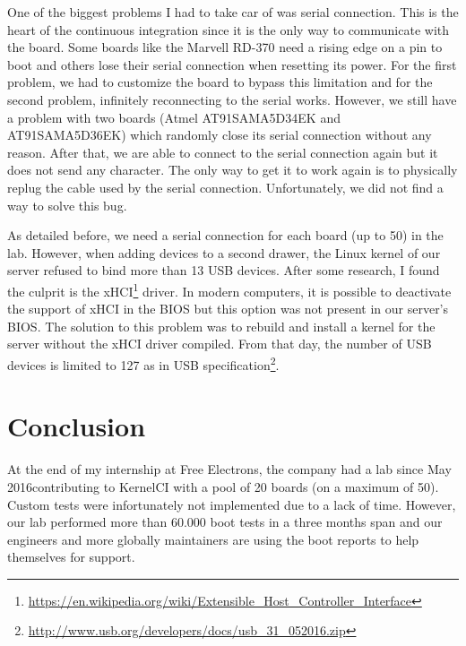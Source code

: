 One of the biggest problems I had to take car of was serial connection. This is the heart of the continuous integration since it is the only way to communicate with the board. Some boards like the Marvell RD-370 need a rising edge on a pin to boot and others lose their serial connection when resetting its power. For the first problem, we had to customize the board to bypass this limitation and for the second problem, infinitely reconnecting to the serial works. However, we still have a problem with two boards (Atmel AT91SAMA5D34EK and AT91SAMA5D36EK) which randomly close its serial connection without any reason. After that, we are able to connect to the serial connection again but it does not send any character. The only way to get it to work again is to physically replug the cable used by the serial connection. Unfortunately, we did not find a way to solve this bug.

As detailed before, we need a serial connection for each board (up to 50) in the lab. However, when adding devices to a second drawer, the Linux kernel of our server refused to bind more than 13 USB devices. After some research, I found the culprit is the xHCI\footnote{\url{https://en.wikipedia.org/wiki/Extensible\_Host\_Controller\_Interface}} driver. In modern computers, it is possible to deactivate the support of xHCI in the BIOS but this option was not present in our server's BIOS. The solution to this problem was to rebuild and install a kernel for the server without the xHCI driver compiled. From that day, the number of USB devices is limited to 127 as in USB specification\footnote{\url{http://www.usb.org/developers/docs/usb\_31\_052016.zip}}.

\section{Conclusion}
At the end of my internship at Free Electrons, the company had a lab since May 2016contributing to KernelCI with a pool of 20 boards (on a maximum of 50). Custom tests were infortunately not implemented due to a lack of time. However, our lab performed more than 60.000 boot tests in a three months span and our engineers and more globally maintainers are using the boot reports to help themselves for support.


